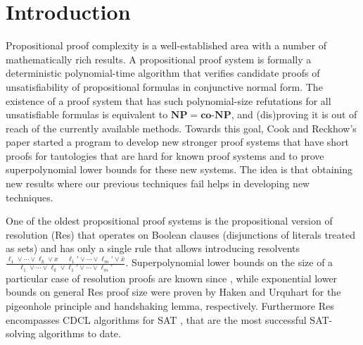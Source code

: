 \documentclass[11pt]{article}
\newcommand{\scterm}[1]{{\textrm{\sc #1}}}
\newcommand{\hit}{\scterm{Hitting}}
\newcommand{\res}{\scterm{Res}}
\newcommand{\resp}{{\res}$(\oplus)$}
\newcommand{\hitp}{{\hit}$(\oplus)$}
\newcommand{\olnot}[1]{\overline{#1}}
\numberwithin{equation}{section}
\begin{document}
\begin{abstract}
We consider multiple extensions of {\hit}, and in particular a proof system {\hitp} related to the {\resp} proof system for which no superpolynomial-size lower bounds are known. {\hitp} p-simulates the tree-like version of {\resp} and is at least quasi-polynomially stronger. We show that formulas expressing the non-existence of perfect matchings in the graphs $K_{n,n+2}$ are exponentially hard for {\hitp} via a reduction to the partition bound for communication complexity.

\end{abstract}
\pagebreak
\tableofcontents
\section{Introduction}
Propositional proof complexity is a well-established area with a number
of mathematically rich results. A propositional proof system \cite{CR79}
is formally a deterministic polynomial-time algorithm that verifies
candidate proofs of unsatisfiability of propositional formulas in conjunctive normal form.
The existence of a proof system that has such polynomial-size refutations for
all unsatisfiable formulas is equivalent to $\mathbf{NP}=\mathbf{co\textbf{-}NP}$,
and (dis)proving it is out of reach of the currently available methods.
Towards this goal, 
Cook and Reckhow's paper \cite{CR79}
started a program to develop new stronger proof systems 
that have short proofs for tautologies 
that are hard for known proof systems
and to prove superpolynomial lower bounds for these new systems.
The idea is that obtaining new results where our previous techniques fail helps in developing new techniques.

One of the oldest propositional proof systems is the propositional version of resolution ({\res}) \cite{Bla37, DP60}
that operates on Boolean clauses (disjunctions of literals treated as sets)
and has only a single rule that allows introducing resolvents
$\frac{\ell_1\lor\dotsb\lor\ell_k\lor x\;\quad \ell_1'\lor\dotsb\lor\ell_m'\lor\olnot{x}}{\ell_1\lor\dotsb\lor\ell_k\lor \ell_1'\lor\dotsb\lor\ell_m'}$.
Superpolynomial lower bounds on the size of a particular case of resolution proofs
are known since \cite{Tse68}, while exponential lower bounds on general {\res} proof size were proven by Haken \cite{Hak85} and Urquhart \cite{Urq87}
for the pigeonhole principle and handshaking lemma, respectively.
Furthermore {\res} encompasses CDCL algorithms for SAT \cite{BKS04,PD11}, that are the most successful SAT-solving algorithms to date.
\end{document}
